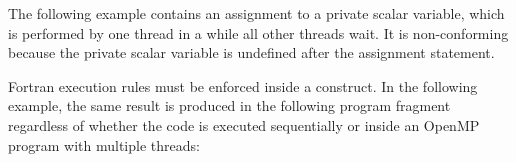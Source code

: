 
The following example contains an assignment to a private scalar variable, which 
is performed by one thread in a  while all other threads wait. 
It is non-conforming because the private scalar variable is undefined after the 
assignment statement. 


Fortran execution rules must be enforced inside a  construct. 
In the following example, the same result is produced in the following program 
fragment regardless of whether the code is executed sequentially or inside an OpenMP 
program with multiple threads:

\fortranspecificend


